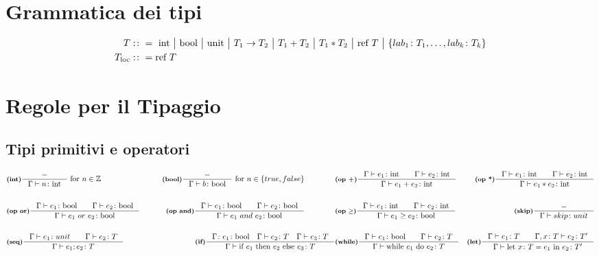 \documentclass[a4paper, 10pt]{article}
\newcommand{\numberset}{\mathbb}
\newcommand{\Z}{\numberset{Z}}
\newcommand{\integer}{\textup{int}}
\newcommand{\bool}{\textup{bool}}
\newcommand{\infer}[4]{\inference[\textbf{#1}]{#2}{#3}#4 }
\begin{document}
\section*{Grammatica dei tipi}
\begin{minipage}{.45\linewidth}
	\begin{flushleft}
	\begin{align*}
		T&:\colon=\ \integer\ \big|\ \bool\ \big|\ \textup{unit}\ \big|\ T_1\rightarrow T_2\ \big|\ T_1 + T_2\ \big|\ T_1 * T_2\ 
		\big|\ \textup{ref}\ T\ \big|\ \{lab_1\colon T_1, \dots, lab_k\colon T_k \} \\
		T_{\text{loc}}&:\colon = \text{ref } T
	\end{align*}	
	\end{flushleft}
\end{minipage}
\section*{Regole per il Tipaggio}
\subsection*{Tipi primitivi e operatori}
	\begin{align*}
		&\infer{(int)}{-}{\Gamma \vdash n\colon \integer}{\ \textup{for}\ n \in \Z} 
		&\infer{(bool)}{-}{\Gamma \vdash b\colon \bool}{\ \textup{for}\ n \in \{true, false\}} \qquad\qquad
		&\infer{(op +)}{\Gamma \vdash e_1\colon \integer\qquad \Gamma \vdash e_2\colon \integer}{\Gamma\vdash e_1 + e_2 \colon \integer}{}
		&\infer{(op *)}{\Gamma \vdash e_1\colon \integer\qquad \Gamma \vdash e_2\colon \integer}{\Gamma\vdash e_1 * e_2 \colon \integer}{} \\ \\
		&\infer{(op or)}{\Gamma\vdash e_1\colon \bool\qquad \Gamma\vdash e_2\colon\bool}{\Gamma\vdash e_1\ or\ e_2 \colon\bool}{}
		&\infer{(op and)}{\Gamma\vdash e_1\colon \bool\qquad \Gamma\vdash e_2\colon\bool}{\Gamma\vdash e_1\ and\ e_2 \colon\bool}{} \qquad\qquad
		&\infer{(op $ \geq $)}{\Gamma \vdash e_1\colon \integer\qquad \Gamma \vdash e_2\colon \integer}{\Gamma\vdash e_1 \geq e_2 \colon \bool}{}
		&\infer{(skip)}{-}{\Gamma\vdash skip\colon unit}{}\\ \\
		&\infer{(seq)}{\Gamma \vdash e_1\colon unit \qquad \Gamma\vdash e_2\colon T}{\Gamma \vdash e_1;e_2\colon T}{} \qquad\qquad
		&\infer{(if)}{\Gamma\colon e_1\colon\bool\quad\Gamma\vdash e_2\colon T\quad \Gamma\vdash e_3 \colon T}{\Gamma\vdash \textup{if}\ e_1\ \textup{then}\ e_2\ \textup{else}\ e_3\colon T }{} 
		&\infer{(while)}{\Gamma\vdash e_1 \colon \bool\qquad \Gamma\vdash e_2 \colon T}{\Gamma \vdash\textup{while}\ e_1\ \textup{do}\ e_2\colon T}{}
		&\infer{(let)}{\Gamma \vdash e_1\colon T\qquad \Gamma,x\colon T \vdash e_2\colon T'}{
			\Gamma\vdash \textup{let}\ x\colon T = e_1\ \textup{in}\ e_2\colon T'}{}
	\end{align*}
\end{document}
